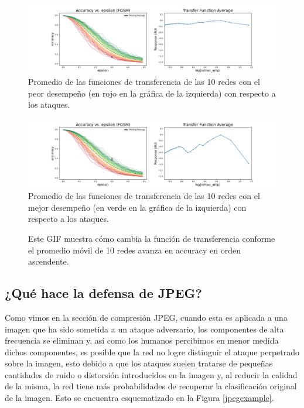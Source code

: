 \begin{figure}[H]
    \centering
    \includegraphics[width=\textwidth]{images/bode_diagrams/average_bad.png}
    \caption{Promedio de las funciones de transferencia de las 10 redes con el peor desempeño (en rojo en la gráfica de la izquierda) con respecto a los ataques.}
    \label{bode_average_bad}
\end{figure}
\begin{figure}[H]
    \centering
        \includegraphics[width=\textwidth]{images/bode_diagrams/average_good.png}
        \caption{Promedio de las funciones de transferencia de las 10 redes con el mejor desempeño (en verde en la gráfica de la izquierda) con respecto a los ataques.}
    \label{bode_average_good}
\end{figure}
\begin{figure}[H]
    \centering
    \caption{Este GIF muestra cómo cambia la función de transferencia conforme el promedio móvil de 10 redes avanza en accuracy en orden ascendente.}
    \label{bode_moving_average_gif}
\end{figure}

\pagebreak

\subsection{¿Qué hace la defensa de JPEG?}

Como vimos en la sección de compresión JPEG, cuando esta es aplicada a una imagen que ha sido sometida a un ataque adversario, los componentes de alta frecuencia se eliminan y, así como los humanos percibimos en menor medida dichos componentes, es posible que la red no logre distinguir el ataque perpetrado sobre la imagen, esto debido a que los ataques suelen tratarse de pequeñas cantidades de ruido o distorsión introducidos en la imagen y, al reducir la calidad de la misma, la red tiene más probabilidades de recuperar la clasificación original de la imagen. Esto se encuentra esquematizado en la Figura \ref{jpegexample}.

